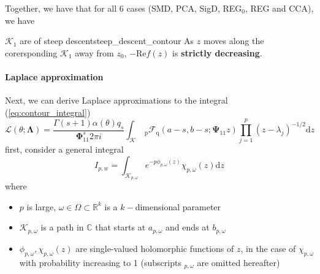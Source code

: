 \documentclass[twoside]{article}
\begin{document}
Together, we have that for all 6 cases (SMD, PCA, SigD, REG$_0$, REG and CCA), we have 
\begin{lemma}{$\mathcal{K}_1$ are of steep descent}{steep_descent_contour}
    As $z$ moves along the corersponding $\mathcal{K}_1$ away from $z_0$, $-\mathrm{Re}f(z)$ is \textbf{strictly decreasing}.
\end{lemma}

\paragraph*{Laplace approximation}
Next, we can derive Laplace approximations to the integral (\ref{eq:contour_integral})
$$
\mathcal{L}(\theta;\boldsymbol{\Lambda}) = \frac{\Gamma(s+1)\alpha(\theta)q_s}{\boldsymbol{\Phi}^s_{11}2\pi i}\int_{\mathcal{K}}\ _{\mathrm{p}}\mathcal{F}_{\mathrm{q}}(a-s,b-s;\boldsymbol{\Psi}_{11}z)\prod^p_{j=1}(z-\lambda_j)^{-1/2}\mathrm{d}z
$$
first, consider a general integral
$$
I_{p,w} = \int_{\mathcal{K}_{p,\omega}} e^{-p\phi_{p,\omega}(z)}\chi_{p,\omega}(z)\mathrm{d}z
$$
where
\begin{itemize}
    \item $p$ is large, $\omega \in \Omega \subset \mathbb{R}^k$ is a $k-$dimensional parameter
    \item $\mathcal{K}_{p,\omega}$ is a path in $\mathbb{C}$ that starts at $a_{p,\omega}$ and ends at $b_{p,\omega}$
    \item $\phi_{p,\omega},\chi_{p,\omega}(z)$ are single-valued holomorphic functions of $z$, in the case of $\chi_{p,\omega}$ with probability increasing to 1 (subscripts $_{p,\omega}$ are omitted hereafter)
\end{itemize}
\end{document}
